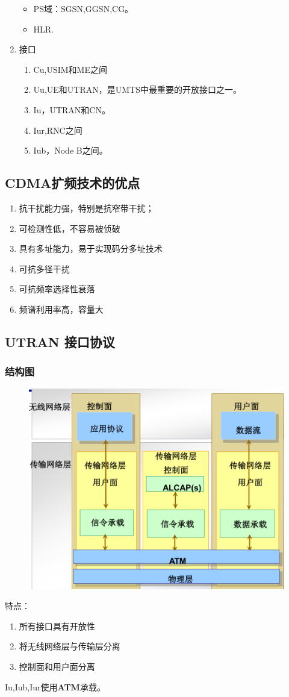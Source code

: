 \begin{enumerate}
\begin{itemize}
		\item PS域：SGSN,GGSN,CG。
		\item HLR.
	\end{itemize}
	\item 接口
	\begin{enumerate}
		\item Cu,USIM和ME之间
		\item Uu,UE和UTRAN，是UMTS中最重要的开放接口之一。
		\item Iu，UTRAN和CN。
		\item Iur,RNC之间
		\item Iub，Node B之间。
	\end{enumerate}
\end{enumerate}
\subsection{CDMA扩频技术的优点}
\begin{enumerate}
	\item 抗干扰能力强，特别是抗窄带干扰；
	\item 可检测性低，不容易被侦破
	\item 具有多址能力，易于实现码分多址技术
	\item 可抗多径干扰
	\item 可抗频率选择性衰落
	\item 频谱利用率高，容量大
\end{enumerate}
\subsection{UTRAN 接口协议}
\subsubsection{结构图}
\begin{figure}[H]
	\centering
	\includegraphics[width=0.7\linewidth]{figures/screenshot014}
	\caption{}
	\label{fig:screenshot014}
\end{figure}
特点：
\begin{enumerate}
	\item 所有接口具有开放性
	\item 将无线网络层与传输层分离
	\item 控制面和用户面分离
\end{enumerate}
Iu,Iub,Iur使用\textbf{ATM}承载。

